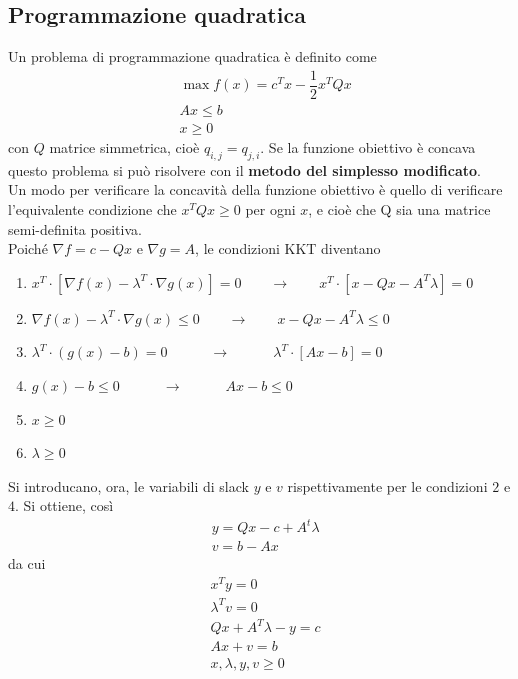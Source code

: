 \documentclass[a4paper]{extarticle}
\begin{document}
\subsection{Programmazione quadratica}
Un problema di programmazione quadratica è definito come
\begin{align*}
    &\max f(x) = c^T x - \dfrac{1}{2} x^T Qx\\
    & Ax \leq b\\
    & x \geq 0
\end{align*}
con $Q$ matrice simmetrica, cioè $q_{i,j} = q_{j,i}$. Se la funzione obiettivo è concava questo problema si può risolvere con il \textbf{metodo del simplesso modificato}.\\
Un modo per verificare la concavità della funzione obiettivo è quello di verificare l'equivalente condizione che $x^T Q x \geq 0$ per ogni $x$, e cioè che Q sia una matrice semi-definita positiva.\\
Poiché $\nabla f = c - Qx$ e $\nabla g = A$, le condizioni KKT diventano
\begin{enumerate}
    \item $x^T \cdot \left[\nabla f(x) - \lambda^T \cdot \nabla g(x)\right] = 0 \hspace{2em} \rightarrow \hspace{2em} x^T \cdot \left[x-Qx - A^T \lambda\right] = 0$
    \item $\nabla f(x) - \lambda^T \cdot \nabla g(x) \leq 0 \hspace{2em} \rightarrow \hspace{2em} x-Qx - A^T \lambda \leq 0$
    \item $\lambda^T \cdot (g(x) - b) = 0 \hspace{3em} \rightarrow \hspace{3em} \lambda^T \cdot \left[Ax - b\right] = 0$
    \item $g(x) - b \leq 0 \hspace{3em} \rightarrow \hspace{3em} Ax - b \leq 0$
    \item $x \geq 0$
    \item $\lambda \geq 0$
\end{enumerate}
Si introducano, ora, le variabili di slack $y$ e $v$ rispettivamente per le condizioni $2$ e $4$. Si ottiene, così
\begin{align*}
    &y=Qx - c + A^t \lambda\\
    &v=b-Ax
\end{align*}
da cui
\begin{align*}
    &x^T y = 0\\
    &\lambda^T v = 0\\
    &Qx + A^T \lambda - y = c\\
    &Ax + v = b\\
    &x,\lambda,y,v \geq 0\\
\end{align*}
\end{document}
